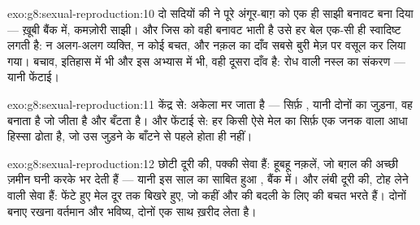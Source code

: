 \begin{solution}{exo:g8:sexual-reproduction:10}
दो सदियों की  ने पूरे अंगूर-बाग़ को एक ही साझी बनावट बना दिया ---
ख़ूबी बैंक में, कमज़ोरी साझी। और जिस  को वही बनावट भाती है उसे हर
बेल एक-सी ही स्वादिष्ट लगती है: न अलग-अलग व्यक्ति, न कोई बचत, और नक़ल का
दाँव सबसे बुरी मेज़ पर वसूल कर लिया गया। बचाव, इतिहास में भी और इस
अभ्यास में भी, वही दूसरा दाँव है: रोध वाली नस्ल का संकरण --- यानी
फेंटाई।
\end{solution}

\begin{solution}{exo:g8:sexual-reproduction:11}
केंद्र से: अकेला  मर जाता है --- सिर्फ़ , यानी दोनों का
जुड़ना, वह  बनाता है जो जीता है और बँटता है। और फेंटाई से: हर
 किसी ऐसे मेल का सिर्फ़ एक जनक वाला आधा हिस्सा ढोता है, जो उस
जुड़ने के बाँटने से पहले होता ही नहीं।
\end{solution}

\begin{solution}{exo:g8:sexual-reproduction:12}
 छोटी दूरी की, पक्की सेवा हैं: हूबहू नक़लें, जो बग़ल की अच्छी
ज़मीन घनी करके भर देती हैं --- यानी इस साल का साबित हुआ , बैंक में।
और  लंबी दूरी की, टोह लेने वाली सेवा हैं: फेंटे हुए मेल दूर तक बिखरे
हुए, जो कहीं और की बदली  के लिए  की बचत भरते हैं।
दोनों बनाए रखना वर्तमान और भविष्य, दोनों एक साथ ख़रीद लेता है।
\end{solution}

